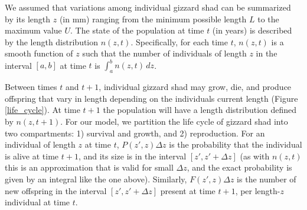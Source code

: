 \documentclass[preprint,review,12pt,authoryear]{elsarticle}
\def\ds{\displaystyle}
\begin{document}
We assumed that variations among individual gizzard shad can be summarized by its length $z$ (in mm) ranging from the minimum possible length $L$ to the maximum value $U$. 
The state of the population at time $t$ (in years) is described by the length distribution $n(z,t)$. 
Specifically, for each time $t$, $n(z,t)$ is a smooth function of $z$ such that the number of individuals of length $z$ in the interval $[a,b]$ at time $t$ is $\ds \int_a^b n(z,t) \, dz$. 

Between times $t$ and $t+1$, individual gizzard shad may grow, die, and produce offspring that vary in length depending on the individuals current length (Figure \ref{life_cycle}). 
At time $t+1$ the population will have a length distribution defined by $n(z, t+1)$. 
For our model, we partition the life cycle of gizzard shad into two compartments: 1) survival and growth, and  2) reproduction. 
For an individual of length $z$ at time $t$, $P(z',z)\Delta z$ is the probability that the individual is alive at time $t+1$, and its size is in the interval $[z', z' + \Delta z]$ (as with $n(z,t)$ this is an approximation that is valid for small $\Delta z$, and the exact probability is given by an integral like the one above). 
Similarly, $F(z',z)\Delta z$ is the number of new offspring in the interval $[z', z' + \Delta z]$ present at time $t+1$, per length-$z$ individual at time $t$.
\end{document}
